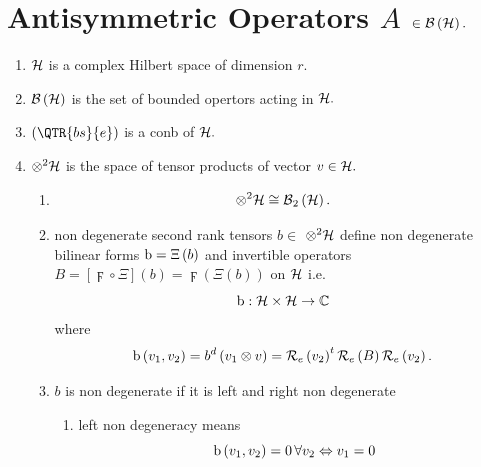                      


\section{ Antisymmetric Operators $A$ $\in {\cal B}\left( {\cal H}\right) .$}

\begin{enumerate}
\item ${\cal H}$ is a complex Hilbert space of dimension $r$.

\item ${\cal B}\left( {\cal H}\right) $ is the set of bounded opertors
acting in ${\cal H}.$

\item $\left( \QTR{bs}{e}\right) $ is a conb of ${\cal H}.$

\item ${\LARGE \otimes }^{2}{\cal H}$ is the space of tensor products of
vector $v\in {\cal H}.$

\begin{enumerate}
\item 
\begin{equation}
{\Large \otimes }^{2}{\cal H\cong B}_{2}\left( {\cal H}\right) .
\end{equation}

\item non degenerate second rank tensors $b\in $ ${\normalsize \otimes }^{2}%
{\cal H}$ define non degenerate bilinear forms ${\rm b}=\Xi \left( b\right) $
and invertible operators $B=\left[ \digamma \circ \Xi \right] \left(
b\right) =\digamma \left( \Xi \left( b\right) \right) $ on ${\cal H}$ i.e.%
\begin{equation}
{\rm b}:{\cal H\times H}\rightarrow {\Bbb C}
\end{equation}%
where 
\begin{equation}
{\rm b}\left( v_{1},v_{2}\right) =b^{d}\left( v_{1}\otimes v\right) ={\cal R}%
_{e}\left( v_{2}\right) ^{t}{\cal R}_{e}\left( B\right) {\cal R}_{e}\left(
v_{2}\right) .
\end{equation}

\item $b$ is non degenerate if it is left and right non degenerate

\begin{enumerate}
\item left non degeneracy means 
\begin{equation}
{\rm b}\left( v_{1},v_{2}\right) =0\,\forall v_{2}\Leftrightarrow v_{1}=0
\end{equation}


\end{enumerate}
\end{enumerate}
\end{enumerate}
